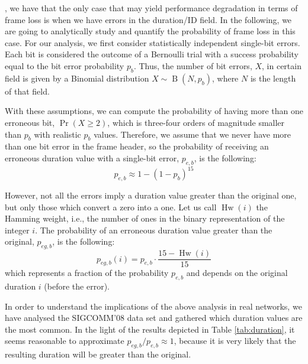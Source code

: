 \documentclass[twoside,nohyper]{tufte-book}
\theoremstyle{definition}
\theoremstyle{definition}
\theoremstyle{definition}
\theoremstyle{remark}
\begin{document}
, we have that the only case that may yield
performance degradation in terms of frame loss is when we have errors in
the duration/ID field. In the following, we are going to analytically
study and quantify the probability of frame loss in this case. For our
analysis, we first consider statistically independent single-bit errors.
Each bit is considered the outcome of a Bernoulli trial with a success
probability equal to the bit error probability \(p_{b}\). Thus, the
number of bit errors, \(X\), in certain field is given by a Binomial
distribution \(X\sim \operatorname{B}(N, p_b)\), where \(N\) is the
length of that field.

With these assumptions, we can compute the probability of having more
than one erroneous bit, \(\Pr(X \geq 2)\), which is three-four orders of
magnitude smaller than \(p_b\) with realistic \(p_b\) values. Therefore,
we assume that we never have more than one bit error in the frame
header, so the probability of receiving an erroneous duration value with
a single-bit error, \(p_{e,b}\), is the following:
%
\begin{equation}
 p_{e,b} \approx 1 - (1 - p_b)^{15} \label{eq:peb}
\end{equation}
%

However, not all the errors imply a duration value greater than the
original one, but only those which convert a zero into a one. Let us
call \(\operatorname{Hw}(i)\) the Hamming weight, i.e., the number of
ones in the binary representation of the integer \(i\). The probability
of an erroneous duration value greater than the original, \(p_{eg,b}\),
is the following:
%
\begin{equation}
 p_{eg,b}(i) = p_{e,b}\cdot \frac{15 -\operatorname{Hw}(i)}{15}
 \label{eq:pegb}
\end{equation}
%
which represents a fraction of the probability \(p_{e,b}\) and depends
on the original duration \(i\) (before the error).

In order to understand the implications of the above analysis in real
networks, we have analysed the SIGCOMM'08 data
set\cite[0pt]{umd-sigcomm2008-2009-03-02}
and gathered which duration values are the most common. In the light of
the results depicted in Table \ref{tab:duration}, it seems reasonable to
approximate \(p_{eg,b}/p_{e,b} \approx 1\), because it is very likely
that the resulting duration will be greater than the original.
\end{document}

